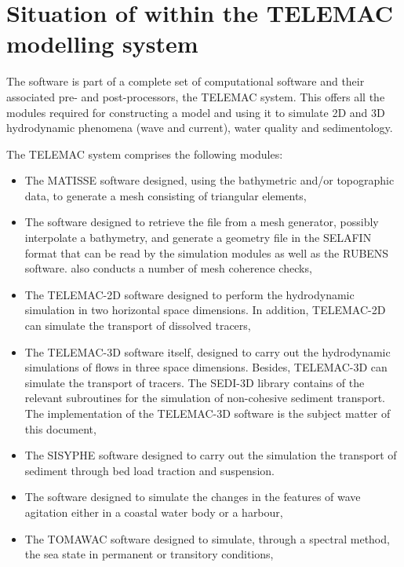 \section{Situation of \artemis{} within the TELEMAC modelling system}

The \artemis{} software is part of a complete set of computational software and their associated pre- and post-processors, the TELEMAC system. This offers all the modules required for constructing a model and using it to simulate 2D and 3D hydrodynamic phenomena (wave and current), water quality and sedimentology.

The TELEMAC system comprises the following modules:

\begin{itemize}
\item  The MATISSE software designed, using the bathymetric and/or topographic
  data, to generate a mesh consisting of triangular elements,

\item  The \stbtel{} software designed to retrieve the file from a mesh
  generator, possibly interpolate a bathymetry, and generate a geometry file in
    the SELAFIN format that can be read by the simulation modules as well as
    the RUBENS software. \stbtel{} also conducts a number of mesh coherence
    checks,

\item  The TELEMAC-2D software designed to perform the hydrodynamic simulation
  in two horizontal space dimensions. In addition, TELEMAC-2D can simulate the
    transport of dissolved tracers,

\item  The TELEMAC-3D software itself, designed to carry out the hydrodynamic
  simulations of flows in three space dimensions. Besides, TELEMAC-3D can
    simulate the transport of tracers. The SEDI-3D library contains of the
    relevant subroutines for the simulation of non-cohesive sediment transport.
    The implementation of the TELEMAC-3D software is the subject matter of this
    document,

\item  The SISYPHE software designed to carry out the simulation the transport
  of sediment through bed load traction and suspension.

\item  The \artemis{} software designed to simulate the changes in the features
  of wave agitation either in a coastal water body or a harbour,

\item  The TOMAWAC software designed to simulate, through a spectral method,
  the sea state in permanent or transitory conditions,


\end{itemize}
